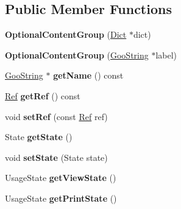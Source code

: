 \subsection*{Public Member Functions}
\begin{DoxyCompactItemize}
\item 
\mbox{\label{class_optional_content_group_a51edaf5e2b7e1857580e5de8b9083c6b}} 
{\bfseries Optional\+Content\+Group} (\hyperlink{class_dict}{Dict} $\ast$dict)
\item 
\mbox{\label{class_optional_content_group_a61cd3ef89fa4f599e10d8c45934fe52b}} 
{\bfseries Optional\+Content\+Group} (\hyperlink{class_goo_string}{Goo\+String} $\ast$label)
\item 
\mbox{\label{class_optional_content_group_a0638d697490cc2a946ba30191bb09254}} 
\hyperlink{class_goo_string}{Goo\+String} $\ast$ {\bfseries get\+Name} () const
\item 
\mbox{\label{class_optional_content_group_ad0bcc050dad92501b666f4f2cb35de8e}} 
\hyperlink{struct_ref}{Ref} {\bfseries get\+Ref} () const
\item 
\mbox{\label{class_optional_content_group_a1be0cb32ab7896d8bb0a2e94ba964042}} 
void {\bfseries set\+Ref} (const \hyperlink{struct_ref}{Ref} ref)
\item 
\mbox{\label{class_optional_content_group_ac576e7081fe078f551ef57c2d259010f}} 
State {\bfseries get\+State} ()
\item 
\mbox{\label{class_optional_content_group_a8983cc6e6ecba2081b2130f80b24aaf2}} 
void {\bfseries set\+State} (State state)
\item 
\mbox{\label{class_optional_content_group_aea850bf0faadf83f0c11bd065b50ab5e}} 
Usage\+State {\bfseries get\+View\+State} ()
\item 
\mbox{\label{class_optional_content_group_a313320d5a921dd8f31b37adfdca24281}} 
Usage\+State {\bfseries get\+Print\+State} ()
\end{DoxyCompactItemize}


